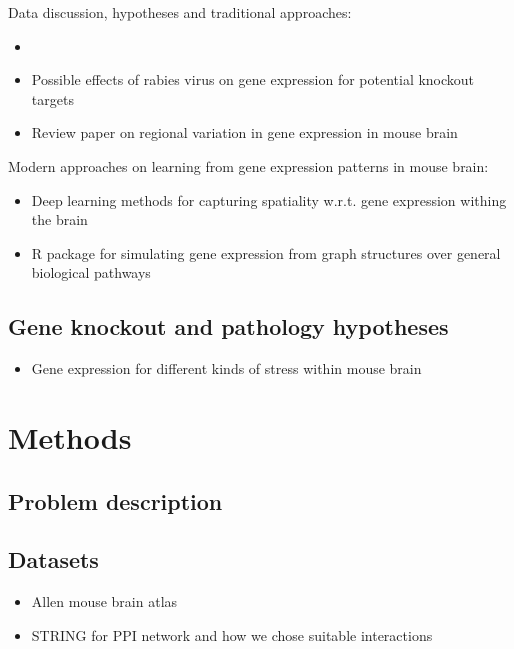 \documentclass[]{article}
\renewcommand{\cite}{\citep}
\begin{document}
Data discussion, hypotheses and traditional approaches:
\begin{itemize}
	\item \cite{noauthor_clustering_nodate}
	\item Possible effects of rabies virus on gene expression\cite{prosniak_effect_2001} for potential knockout targets
	
	\item Review paper on regional variation in gene expression in mouse brain \cite{pavlidis_analysis_2001}
\end{itemize}

Modern approaches on learning from gene expression patterns in mouse brain:
\begin{itemize}
	\item Deep learning methods for capturing spatiality w.r.t. gene expression withing the brain \cite{zeng_deep_2015}
	\item R package for simulating gene expression from graph structures over general biological pathways \cite{kelly_graphsim_2020} 
\end{itemize}

\subsection{Gene knockout and pathology hypotheses}
\begin{itemize}
	\item Gene expression for different kinds of stress within mouse brain \cite{Flati2020}
\end{itemize}

\section{Methods}
\subsection{Problem description}

\subsection{Datasets}
\begin{itemize}
	\item Allen mouse brain atlas \cite{MouseBrainAtlas}
	\item STRING for PPI network and how we chose suitable interactions \cite{STRINGv10}
\end{itemize}
\end{document}
